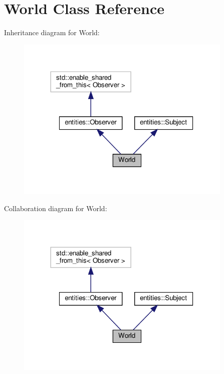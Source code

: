 \hypertarget{classWorld}{}\section{World Class Reference}
\label{classWorld}


Inheritance diagram for World\+:\nopagebreak
\begin{figure}[H]
\begin{center}
\leavevmode
\includegraphics[width=293pt]{classWorld__inherit__graph}
\end{center}
\end{figure}


Collaboration diagram for World\+:\nopagebreak
\begin{figure}[H]
\begin{center}
\leavevmode
\includegraphics[width=293pt]{classWorld__coll__graph}
\end{center}
\end{figure}
